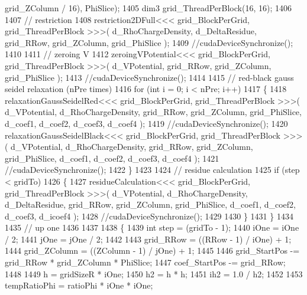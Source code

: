 \begin{DoxyCode}
      grid\_ZColumn / 16), PhiSlice);
1405             dim3 grid\_ThreadPerBlock(16, 16);
1406 
1407             \textcolor{comment}{// restriction}
1408             restriction2DFull<<< grid\_BlockPerGrid, grid\_ThreadPerBlock >>>( d\_RhoChargeDensity, 
      d\_DeltaResidue, grid\_RRow, grid\_ZColumn, grid\_PhiSlice );
1409             \textcolor{comment}{//cudaDeviceSynchronize();}
1410 
1411             \textcolor{comment}{// zeroing V}
1412             zeroingVPotential<<< grid\_BlockPerGrid, grid\_ThreadPerBlock >>>( d\_VPotential, grid\_RRow, 
      grid\_ZColumn, grid\_PhiSlice );
1413             \textcolor{comment}{//cudaDeviceSynchronize();}
1414 
1415             \textcolor{comment}{// red-black gauss seidel relaxation (nPre times)}
1416             \textcolor{keywordflow}{for} (\textcolor{keywordtype}{int} i = 0; i < nPre; i++)
1417             \{
1418                 relaxationGaussSeidelRed<<< grid\_BlockPerGrid, grid\_ThreadPerBlock >>>( d\_VPotential, 
      d\_RhoChargeDensity, grid\_RRow, grid\_ZColumn, grid\_PhiSlice, d\_coef1, d\_coef2, d\_coef3, d\_coef4 );
1419                 \textcolor{comment}{//cudaDeviceSynchronize();}
1420                 relaxationGaussSeidelBlack<<< grid\_BlockPerGrid, grid\_ThreadPerBlock >>>( d\_VPotential, 
      d\_RhoChargeDensity, grid\_RRow, grid\_ZColumn, grid\_PhiSlice, d\_coef1, d\_coef2, d\_coef3, d\_coef4 );
1421                 \textcolor{comment}{//cudaDeviceSynchronize();}
1422             \}
1423 
1424             \textcolor{comment}{// residue calculation}
1425             \textcolor{keywordflow}{if} (step < gridTo)
1426             \{
1427                 residueCalculation<<< grid\_BlockPerGrid, grid\_ThreadPerBlock >>>( d\_VPotential, 
      d\_RhoChargeDensity, d\_DeltaResidue, grid\_RRow, grid\_ZColumn, grid\_PhiSlice, d\_coef1, d\_coef2, d\_coef3, d\_icoef4 );
1428                 \textcolor{comment}{//cudaDeviceSynchronize();}
1429 
1430             \}
1431         \}
1434 
1435         \textcolor{comment}{// up one}
1436 
1437 
1438         \{
1439             \textcolor{keywordtype}{int} step = (gridTo - 1);
1440             iOne = iOne / 2;
1441             jOne = jOne / 2;
1442         
1443             grid\_RRow       = ((RRow - 1) / iOne) + 1;
1444             grid\_ZColumn    = ((ZColumn - 1) / jOne) + 1;
1445 
1446             grid\_StartPos -= grid\_RRow * grid\_ZColumn * PhiSlice;
1447             coef\_StartPos -= grid\_RRow;
1448         
1449             h   = gridSizeR * iOne;
1450             h2  = h * h;
1451             ih2 = 1.0 / h2;
1452         
1453             tempRatioPhi = ratioPhi * iOne * iOne;

\end{DoxyCode}
